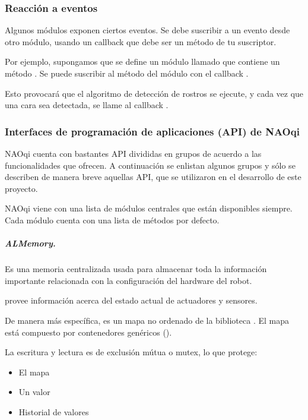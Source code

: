 \subsubsection{Reacción a eventos}
\label{\detokenize{chapter_one/naoqi:reaccion-a-eventos}}
Algunos módulos exponen ciertos eventos. Se debe suscribir a un evento desde otro módulo,
usando un callback que debe ser un método de tu suscriptor.

Por ejemplo, supongamos que se define un módulo llamado  que
contiene un método .
Se puede suscribir  al método  del módulo
 con el callback .

Esto provocará que el algoritmo de detección de rostros se ejecute, y cada vez
que una cara sea detectada, se llame al callback .


\subsubsection{Interfaces de programación de aplicaciones (API) de NAOqi}
\label{\detokenize{chapter_one/naoqi:interfaces-de-programacion-de-aplicaciones-api-de-naoqi}}
NAOqi cuenta con bastantes API divididas en grupos de acuerdo a las
funcionalidades que ofrecen. A continuación se enlistan algunos grupos
y sólo se describen de manera breve aquellas API,
que se utilizaron en el desarrollo de este proyecto.

NAOqi viene con una lista de módulos centrales que están disponibles siempre.
Cada módulo cuenta con una lista de métodos por defecto.


\subparagraph{ALMemory.}
\label{\detokenize{chapter_one/naoqi:id1}}
Es una memoria centralizada usada para almacenar toda la información importante
relacionada con la configuración del hardware del robot.

 provee información acerca del estado actual de actuadores y sensores.

De manera más específica,  es un mapa no ordenado de la biblioteca
. El mapa está compuesto por
contenedores genéricos ().

La escritura y lectura es de exclusión mútua o mutex, lo que protege:
\begin{itemize}
\item {} 
El mapa

\item {} 
Un valor

\item {} 
Historial de valores

\end{itemize}

